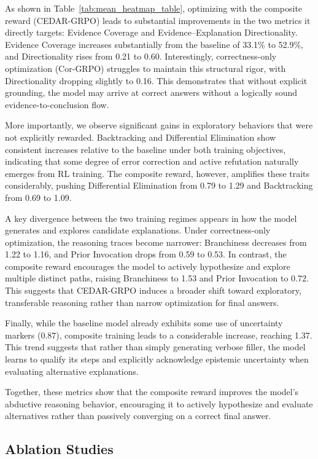 \documentclass[11pt]{article}
\begin{document}
As shown in Table~\ref{tab:mean_heatmap_table}, optimizing with the composite reward (CEDAR-GRPO) leads to substantial improvements in the two metrics it directly targets: Evidence Coverage and Evidence--Explanation Directionality. Evidence Coverage increases substantially from the baseline of 33.1\% to 52.9\%, and Directionality rises from 0.21 to 0.60. Interestingly, correctness-only optimization (Cor-GRPO) struggles to maintain this structural rigor, with Directionality dropping slightly to 0.16. This demonstrates that without explicit grounding, the model may arrive at correct answers without a logically sound evidence-to-conclusion flow.

More importantly, we observe significant gains in exploratory behaviors that were not explicitly rewarded. Backtracking and Differential Elimination show consistent increases relative to the baseline under both training objectives, indicating that some degree of error correction and active refutation naturally emerges from RL training. The composite reward, however, amplifies these traits considerably, pushing Differential Elimination from 0.79 to 1.29 and Backtracking from 0.69 to 1.09.

A key divergence between the two training regimes appears in how the model generates and explores candidate explanations. Under correctness-only optimization, the reasoning traces become narrower: Branchiness decreases from 1.22 to 1.16, and Prior Invocation drops from 0.59 to 0.53. In contrast, the composite reward encourages the model to actively hypothesize and explore multiple distinct paths, raising Branchiness to 1.53 and Prior Invocation to 0.72. This suggests that CEDAR-GRPO induces a broader shift toward exploratory, transferable reasoning rather than narrow optimization for final answers.

Finally, while the baseline model already exhibits some use of uncertainty markers (0.87), composite training leads to a considerable increase, reaching 1.37. This trend suggests that rather than simply generating verbose filler, the model learns to qualify its steps and explicitly acknowledge epistemic uncertainty when evaluating alternative explanations.

Together, these metrics show that the composite reward improves the model's abductive reasoning behavior, encouraging it to actively hypothesize and evaluate alternatives rather than passively converging on a correct final answer.


\subsection{Ablation Studies}
\label{sec:ablations}
\end{document}
